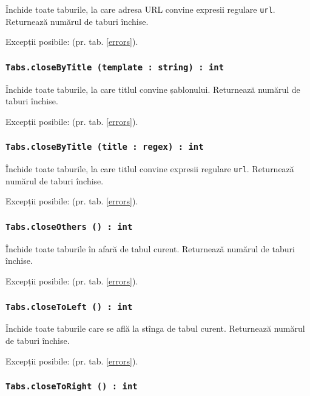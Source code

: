 Închide toate taburile, la care adresa URL convine expresii regulare \texttt{url}. Returnează numărul de taburi închise.

Excepții posibile:  (pr. tab. \ref{errors}).

\subsubsection{\texttt{Tabs.closeByTitle (template : string) : int}}

Închide toate taburile, la care titlul convine șablonului. Returnează numărul de taburi închise.

Excepții posibile:  (pr. tab. \ref{errors}).

\subsubsection{\texttt{Tabs.closeByTitle (title : regex) : int}}

Închide toate taburile, la care titlul convine expresii regulare \texttt{url}. Returnează numărul de taburi închise.

Excepții posibile:  (pr. tab. \ref{errors}).

\subsubsection{\texttt{Tabs.closeOthers () : int}}

Închide toate taburile în afară de tabul curent. Returnează numărul de taburi închise.

Excepții posibile:  (pr. tab. \ref{errors}).

\subsubsection{\texttt{Tabs.closeToLeft () : int}}

Închide toate taburile care se află la stînga de tabul curent. Returnează numărul de taburi închise.

Excepții posibile:  (pr. tab. \ref{errors}).

\subsubsection{\texttt{Tabs.closeToRight () : int}}

